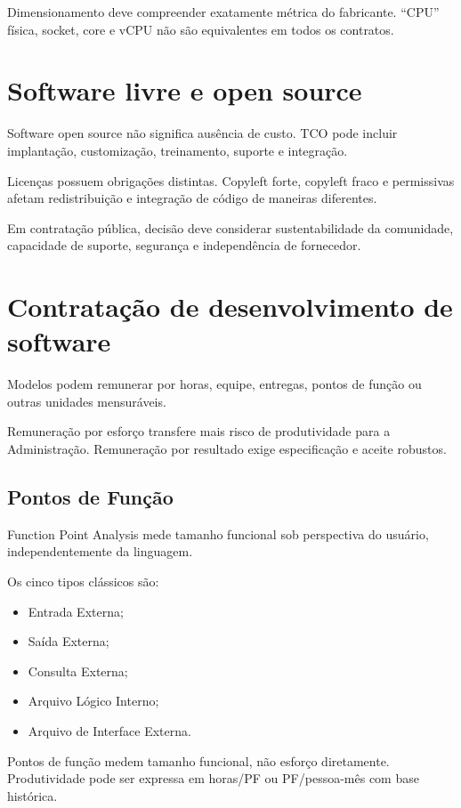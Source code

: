 Dimensionamento deve compreender exatamente métrica do fabricante. ``CPU'' física, socket, core e vCPU não são equivalentes em todos os contratos.

\section{Software livre e open source}

Software open source não significa ausência de custo. TCO pode incluir implantação, customização, treinamento, suporte e integração.

Licenças possuem obrigações distintas. Copyleft forte, copyleft fraco e permissivas afetam redistribuição e integração de código de maneiras diferentes.

Em contratação pública, decisão deve considerar sustentabilidade da comunidade, capacidade de suporte, segurança e independência de fornecedor.

\section{Contratação de desenvolvimento de software}

Modelos podem remunerar por horas, equipe, entregas, pontos de função ou outras unidades mensuráveis.

Remuneração por esforço transfere mais risco de produtividade para a Administração. Remuneração por resultado exige especificação e aceite robustos.

\subsection{Pontos de Função}

Function Point Analysis mede tamanho funcional sob perspectiva do usuário, independentemente da linguagem.

Os cinco tipos clássicos são:
\begin{itemize}
\item Entrada Externa;
\item Saída Externa;
\item Consulta Externa;
\item Arquivo Lógico Interno;
\item Arquivo de Interface Externa.
\end{itemize}

Pontos de função medem tamanho funcional, não esforço diretamente. Produtividade pode ser expressa em horas/PF ou PF/pessoa-mês com base histórica.

